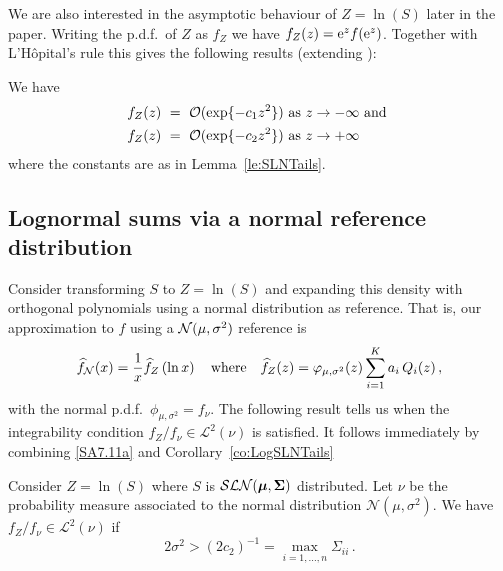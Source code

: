 We are also interested in the asymptotic behaviour of $Z = \ln(S)$ later in the paper. Writing the p.d.f.\ of $Z$ as $f_Z$ we have $f_Z(z) = \mathrm{e}^{z}f(\mathrm{e}^{z})$. Together with L'H\^opital's rule this gives the following results (extending \cite{gao2009asymptotic}):

\begin{corollary} \label{co:LogSLNTails}
We have
\begin{align} \label{LogSLNLeftTail}
	f_Z(z)  \ &=\  {\mathcal{O}}(\exp \{-c_1 z^2 \} ) \text{\ as } z\to -\infty
	 \text{ and } \\
 \label{LogSLNRightTail}
	f_Z(z) \ &=\ {\mathcal{O}}(\exp\{-c_2 z^2 \}) \text{\ as } z \to +\infty
\end{align}
where the constants are as in Lemma~\ref{le:SLNTails}.
\end{corollary}

\subsection{Lognormal sums via a normal reference distribution} \label{SS:LNNormalNu}

Consider transforming $S$ to $Z=\ln(S)$ and expanding this density with orthogonal polynomials using a normal distribution as reference. That is, our approximation to $f$ using a $\mathcal{N}(\mu, \sigma^2)$ reference is
\[ \widehat{f}_{\mathcal{N}}(x) = \frac{1}{x} \widehat{f}_{Z}\left(\ln x \right) \quad\text{where}\quad \widehat{f}_{Z}(z) = \varphi_{\mu,\sigma^2}(z) \sum_{i=1}^K a_i \, Q_i(z) \,, \]
with  the normal p.d.f.\ $\phi_{\mu,\sigma^2}=f_\nu$. The following result tells us when the integrability condition $f_{Z}/f_\nu \in\mathcal{L}^{2}(\nu)$ is satisfied.
It follows immediately by combining \eqref{SA7.11a} and Corollary~\ref{co:LogSLNTails}

\begin{proposition}\label{eq:IntegrabilityConditionNormalHermiteExpansion}
Consider $Z=\ln(S)$ where $S$ is $\mathcal{SLN}(\boldsymbol{\mu},\bm{\Sigma})$ distributed. Let $\nu$ be the probability measure associated to the normal distribution $\mathcal{N}(\mu,\sigma^2)$. We have $f_Z / f_\nu \in\mathcal{L}^{2}(\nu)$ if
\begin{equation} \label{normal_int_cond_1}
	2 \sigma^2 > (2 c_2)^{-1} = \max_{i=1,\dots,n} \Sigma_{ii} \,.
\end{equation}
\end{proposition}


